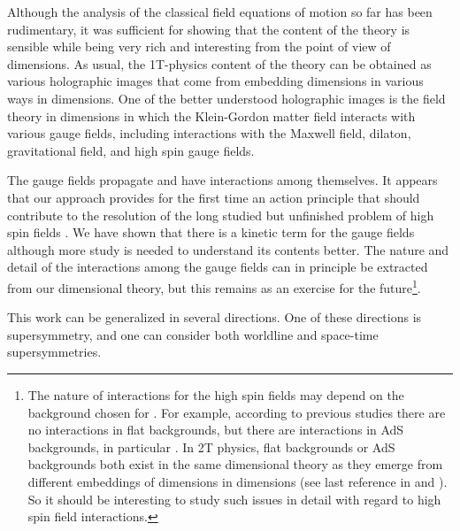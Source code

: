 \documentclass[a4paper,12pt]{article}
\begin{document}
Although the analysis of the classical field equations of motion so far has
been rudimentary, it was sufficient for showing that the content of the
theory is sensible while being very rich and interesting from the point of
view of \coordHE{} dimensions. As usual, the 1T-physics content of the theory can
be obtained as various holographic images that come from embedding \coordHE{}
dimensions in various ways in \coordHE{} dimensions. One of the better understood
holographic images \cite{Dirac}\cite{field2T} is the field theory in \coordHE{}
dimensions in which the Klein-Gordon matter field interacts with various
gauge fields, including interactions with the Maxwell field, dilaton,
gravitational field, and high spin gauge fields.

The gauge fields propagate and have interactions among themselves. It
appears that our approach provides for the first time an action principle
that should contribute to the resolution of the long studied but unfinished
problem of high spin fields \cite{vasil}\cite{segal}\cite{highspin}\cite
{sezgin}. We have shown that there is a kinetic term for the gauge fields
although more study is needed to understand its contents better. The nature
and detail of the interactions among the gauge fields can in principle be
extracted from our \coordHE{} dimensional theory, but this remains as an exercise
for the future\footnote{%
The nature of interactions for the high spin fields may depend on the
background chosen for \coordHE{}. For example, according to previous studies 
\cite{vasil} there are no interactions in flat backgrounds, but there are
interactions in AdS\coordHE{} backgrounds, in particular \coordHE{}. In 2T physics,
flat backgrounds or AdS\coordHE{} backgrounds both exist in the same \coordHE{}
dimensional theory as they emerge from different embeddings of \coordHE{}
dimensions in \coordHE{} dimensions (see last reference in \cite{old2T} and \cite
{field2T}). So it should be interesting to study such issues in detail with
regard to high spin field interactions.}.

This work can be generalized in several directions. One of these directions
is supersymmetry, and one can consider both worldline and space-time
supersymmetries.
\end{document}
